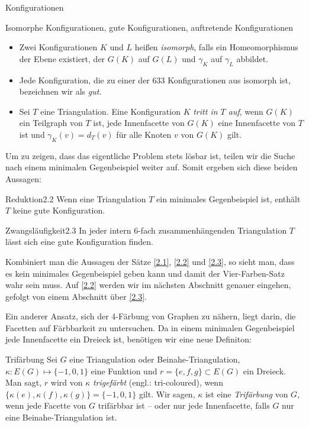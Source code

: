 \begin{section}{Konfigurationen}
 \begin{definition}{Isomorphe Konfigurationen, gute Konfigurationen, auftretende Konfigurationen}
 \-\ 
  \begin{itemize}
   \item Zwei Konfigurationen $K$ und $L$ heißen \textit{isomorph}, falls ein Homeomorphismus der Ebene existiert, der $G(K)$ auf $G(L)$ und $\gamma_K$ auf $\gamma_L$ abbildet. 
   \item Jede Konfiguration, die zu einer der 633 Konfigurationen aus \cite{FourRSST} isomorph ist, bezeichnen wir als \textit{gut}. 
   \item Sei $T$ eine Triangulation. Eine Konfiguration $K$ \textit{tritt in $T$ auf}, wenn $G(K)$ ein Teilgraph von $T$ ist, jede Innenfacette von $G(K)$ eine Innenfacette von $T$ ist und $\gamma_K(v) = d_T(v)$ für alle Knoten $v$ von $G(K)$ gilt.
  \end{itemize}

 \end{definition}

   
 Um zu zeigen, dass das eigentliche Problem stets lösbar ist, teilen wir die Suche nach einem minimalen Gegenbeispiel weiter auf. Somit ergeben sich diese beiden Aussagen:
   
 \begin{satzl}{Reduktion}{2.2}
  Wenn eine Triangulation $T$ ein minimales Gegenbeispiel ist, enthält $T$ keine gute Konfiguration.
 \end{satzl}
   
 \begin{satzl}{Zwangsläufigkeit}{2.3}
  In jeder intern 6-fach zusammenhängenden Triangulation $T$ lässt sich eine gute Konfiguration finden.
 \end{satzl}
   
 Kombiniert man die Aussagen der Sätze \ref{2.1}, \ref{2.2} und \ref{2.3}, so sieht man, dass es kein minimales Gegenbeispiel geben kann und damit der Vier-Farben-Satz wahr sein muss. Auf \ref{2.2} werden wir im nächsten Abschnitt genauer eingehen, gefolgt von einem Abschnitt über \ref{2.3}. 
 
 Ein anderer Ansatz, sich der 4-Färbung von Graphen zu nähern, liegt darin, die Facetten auf Färbbarkeit zu untersuchen. Da in einem minimalen Gegenbeispiel jede Innenfacette ein Dreieck ist, benötigen wir eine neue Definiton:
 
 \begin{definition}{Trifärbung}
  Sei $G$ eine Triangulation oder Beinahe-Triangulation, $\kappa:E(G) \mapsto \{-1,0,1\}$ eine Funktion und $r=\{e,f,g\} \subset E(G)$ ein Dreieck. Man sagt, $r$ wird von $\kappa$ \textit{trigefärbt} (engl.: tri-coloured), wenn $\{\kappa(e),\kappa(f),\kappa(g)\} = \{-1,0,1\}$ gilt. Wir sagen, $\kappa$ ist eine \textit{Trifärbung} von $G$, wenn jede Facette von $G$ trifärbbar ist -- oder nur jede Innenfacette, falls $G$ nur eine Beinahe-Triangulation ist.
 \end{definition}


\end{section}
